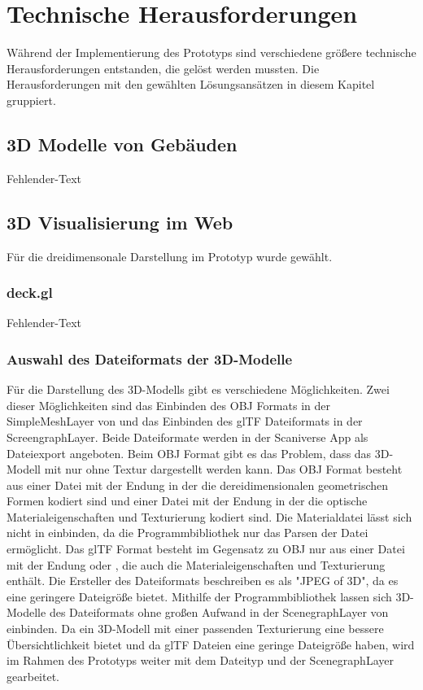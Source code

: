 \newpage
\section{Technische Herausforderungen}
Während der Implementierung des Prototyps sind verschiedene größere technische Herausforderungen entstanden, die gelöst werden mussten. Die Herausforderungen mit den gewählten Lösungsansätzen in diesem Kapitel gruppiert. 

\subsection{3D Modelle von Gebäuden}
Fehlender-Text

\subsection{3D Visualisierung im Web}
Für die dreidimensonale Darstellung im Prototyp wurde \deckgl gewählt.

\subsubsection{deck.gl}
Fehlender-Text

\subsubsection{Auswahl des Dateiformats der 3D-Modelle}

Für die Darstellung des 3D-Modells gibt es verschiedene Möglichkeiten. Zwei dieser Möglichkeiten sind das Einbinden des \ac{OBJ} Formats in der SimpleMeshLayer von \deckgl und das Einbinden des \ac{glTF} Dateiformats in der ScreengraphLayer. Beide Dateiformate werden in der Scaniverse App als Dateiexport angeboten. Beim \ac{OBJ} Format gibt es das Problem, dass das 3D-Modell mit \deckgl nur ohne Textur dargestellt werden kann. Das \ac{OBJ} Format besteht aus einer Datei mit der Endung \obj in der die dereidimensionalen geometrischen Formen kodiert sind und einer Datei mit der Endung \mtl in der die optische Materialeigenschaften und Texturierung kodiert sind. Die Materialdatei lässt sich nicht in \deckgl einbinden, da die \loadersgl Programmbibliothek nur das Parsen der \obj Datei ermöglicht. Das \ac{glTF} Format besteht im Gegensatz zu \ac{OBJ} nur aus einer Datei mit der Endung \gltf oder \glb, die auch die Materialeigenschaften und Texturierung enthält. Die Ersteller des Dateiformats beschreiben es als "JPEG of 3D", da es eine geringere Dateigröße bietet. Mithilfe der \loadersgl Programmbibliothek lassen sich 3D-Modelle des Dateiformats ohne großen Aufwand in der ScenegraphLayer von \deckgl einbinden. Da ein 3D-Modell mit einer passenden Texturierung eine bessere Übersichtlichkeit bietet und da \ac{glTF} Dateien eine geringe Dateigröße haben, wird im Rahmen des Prototyps weiter mit dem Dateityp und der ScenegraphLayer gearbeitet.


